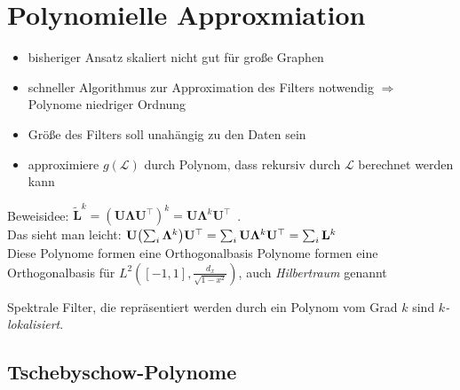 \section{Polynomielle Approxmiation}

\begin{itemize}
  \item bisheriger Ansatz skaliert nicht gut für große Graphen
  \item schneller Algorithmus zur Approximation des Filters notwendig $\Rightarrow$ Polynome niedriger Ordnung
  \item Größe des Filters soll unahängig zu den Daten sein
  \item approximiere $g(\mathcal{L})$ durch Polynom, dass rekursiv durch $\mathcal{L}$ berechnet werden kann
\end{itemize}

Beweisidee: $\mathbf{\tilde L}^k = {\left(\mathbf{U}\mathbf{\Lambda}\mathbf{U}^{\top}\right)}^k = \mathbf{U}\mathbf{\Lambda}^k\mathbf{U^{\top}}$~\cite{GCN}.\\
Das sieht man leicht: $\ma{U} \left(\sum_i \ma{\Lambda}^k \right) \ma{U}^{\top} = \sum_i \ma{U} \ma{\Lambda}^k \ma{U}^{\top} = \sum_i \ma{L}^k$\\

Diese Polynome formen eine Orthogonalbasis
Polynome formen eine Orthogonalbasis für $L^2 \left([-1, 1], \frac{d_x}{\sqrt{1-x^2}}\right)$, auch \emph{Hilbertraum} genannt

Spektrale Filter, die repräsentiert werden durch ein Polynom vom Grad $k$ sind \emph{$k$-lokalisiert}.


\subsection{Tschebyschow-Polynome}

